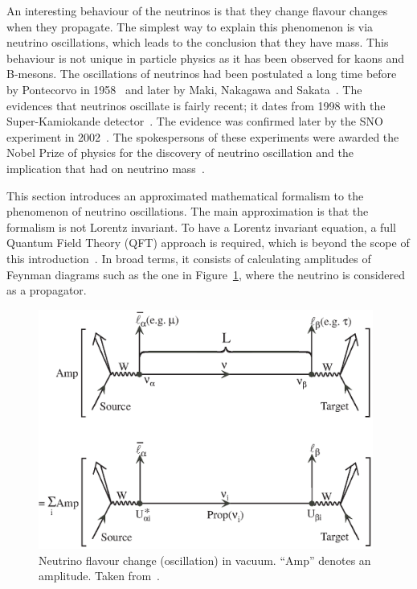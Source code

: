 
An interesting behaviour of the neutrinos is that they change flavour
changes when they propagate. The simplest way to explain this
phenomenon is via neutrino oscillations, which leads to the conclusion
that they have mass. This behaviour is not unique in particle physics
as it has been observed for kaons and B-mesons. The oscillations of
neutrinos had been postulated a long time before by Pontecorvo in
1958~\cite{Pontecorvo1958} and later by Maki, Nakagawa and
Sakata~\cite{Maki:1962mu}. The evidences that neutrinos oscillate is
fairly recent; it dates from 1998 with the Super-Kamiokande
detector~\cite{SK1998}. The evidence was confirmed later by the
\Gls{SNO} experiment in 2002~\cite{SNO2002}. The spokespersons of
these experiments were awarded the Nobel Prize of physics for the
discovery of neutrino oscillation and the implication that had on
neutrino mass~\cite{nobelprize}.

This section introduces an approximated mathematical formalism to the
phenomenon of neutrino oscillations.  The main approximation is that
the formalism is not Lorentz invariant. To have a Lorentz invariant
equation, a full Quantum Field Theory (QFT) approach is required,
which is beyond the scope of this introduction~\cite{Akhmedov2010}. In
broad terms, it consists of calculating amplitudes of Feynman diagrams
such as the one in Figure~\ref{fig:neutrinooscillationdiag}, where the
neutrino is considered as a propagator.

\begin{figure}[ht]
  \vspace{1cm}
  \center
  \includegraphics[width=0.98\textwidth]{images/Intro/SLAC_Fig1.eps}
  \caption[Neutrino flavour change (oscillation) in vacuum]{Neutrino
    flavour change (oscillation) in vacuum. “Amp” denotes an
    amplitude. Taken from~\cite{Kayser:2005cd}.}
  \label{fig:neutrinooscillationdiag}
\end{figure}

